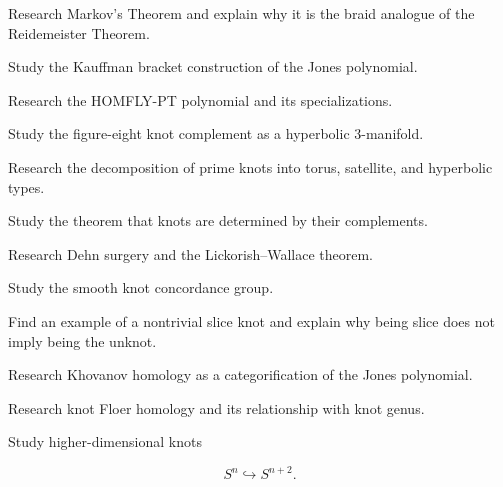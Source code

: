 \begin{exercise}[4]
Research Markov's Theorem and explain why it is the braid analogue of the
Reidemeister Theorem.
\end{exercise}

\begin{exercise}[4]
Study the Kauffman bracket construction of the Jones polynomial.
\end{exercise}

\begin{exercise}[4]
Research the HOMFLY-PT polynomial and its specializations.
\end{exercise}

\begin{exercise}[4]
Study the figure-eight knot complement as a hyperbolic \(3\)-manifold.
\end{exercise}

\begin{exercise}[4]
Research the decomposition of prime knots into torus, satellite, and
hyperbolic types.
\end{exercise}

\begin{exercise}[4]
Study the theorem that knots are determined by their complements.
\end{exercise}

\begin{exercise}[4]
Research Dehn surgery and the Lickorish--Wallace theorem.
\end{exercise}

\begin{exercise}[4]
Study the smooth knot concordance group.
\end{exercise}

\begin{exercise}[4]
Find an example of a nontrivial slice knot and explain why being slice does
not imply being the unknot.
\end{exercise}

\begin{exercise}[4]
Research Khovanov homology as a categorification of the Jones polynomial.
\end{exercise}

\begin{exercise}[4]
Research knot Floer homology and its relationship with knot genus.
\end{exercise}

\begin{exercise}[4]
Study higher-dimensional knots

\[
S^n\hookrightarrow S^{n+2}.
\]
\end{exercise}

